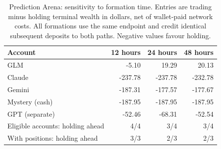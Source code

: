 \begin{table}[htbp]
\centering\small
\caption{Prediction Arena: sensitivity to formation time. Entries are trading minus holding terminal wealth in dollars, net of wallet-paid network costs. All formations use the same endpoint and credit identical subsequent deposits to both paths. Negative values favour holding.}
\label{tab:predictionformation}
\begin{tabular}{lrrr}
\toprule
Account & 12 hours & 24 hours & 48 hours \\
\midrule
GLM & -5.10 & 19.29 & 20.13 \\
Claude & -237.78 & -237.78 & -232.78 \\
Gemini & -187.31 & -177.57 & -177.67 \\
Mystery (cash) & -187.95 & -187.95 & -187.95 \\
GPT (separate) & -52.46 & -68.31 & -52.54 \\
\midrule
Eligible accounts: holding ahead & 4/4 & 3/4 & 3/4 \\
With positions: holding ahead & 3/3 & 2/3 & 2/3 \\
\bottomrule
\end{tabular}
\end{table}
